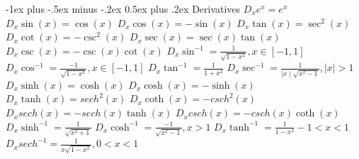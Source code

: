 \documentclass[10pt,landscape]{article}
\makeatletter
\renewcommand{\section}{\@startsection{section}{1}{0mm}%
                                {-1ex plus -.5ex minus -.2ex}%
                                {0.5ex plus .2ex}%
                                {\normalfont\large\bfseries}}
\makeatother
\begin{document}
\raggedright
\footnotesize
\begin{multicols*}{5}


\setlength{\premulticols}{1pt}
\setlength{\postmulticols}{1pt}
\setlength{\multicolsep}{1pt}
\setlength{\columnsep}{2pt}

\section{Derivatives}
\scriptsize
$D_x e^x=e^x$\newline
$D_x \sin(x)=\cos(x)$\newline
$D_x \cos(x)=-\sin(x)$\newline
$D_x \tan(x)=\sec^2(x)$\newline
$D_x \cot(x)=-\csc^2(x)$\newline
$D_x \sec(x)=\sec(x)\tan(x)$\newline
$D_x \csc(x)=-\csc(x)\cot(x)$\newline
$D_x \sin^{-1}=\frac{1}{\sqrt{1-x^2}}, x \in [-1,1]$\newline
$D_x \cos^{-1}=\frac{-1}{\sqrt{1-x^2}}, x \in [-1,1]$\newline
$D_x \tan^{-1}=\frac{1}{1+x^2}$\newline
$D_x \sec^{-1}=\frac{1}{\mid x \mid \sqrt{x^2-1}}, |x| > 1$\newline
$D_x \sinh(x)=\cosh(x)$\newline
$D_x \cosh(x)=-\sinh(x)$\newline
$D_x \tanh(x)=sech^2(x)$\newline
$D_x \coth(x)=-csch^2(x)$\newline
$D_x sech(x)=-sech(x)\tanh(x)$\newline
$D_x csch(x)=-csch(x)\coth(x)$\newline
$D_x \sinh^{-1}=\frac{1}{\sqrt{x^2+1}}$\newline
$D_x \cosh^{-1}=\frac{-1}{\sqrt{x^2-1}}, x > 1$\newline
$D_x \tanh^{-1}=\frac{1}{1-x^2} -1 < x < 1$\newline
$D_x sech^{-1}=\frac{1}{x \sqrt{1-x^2}}, 0 < x < 1$


\end{multicols*}
\end{document}
